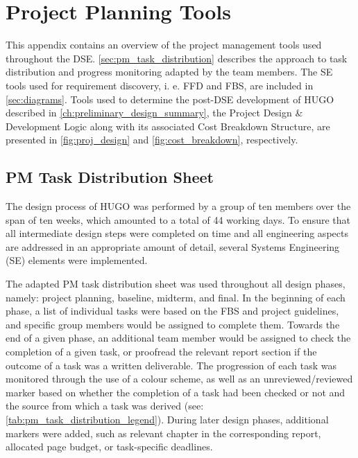 \chapter{Project Planning Tools}
\label{app:project_planning_diagrames}
This appendix contains an overview of the project management tools used throughout the DSE. \autoref{sec:pm_task_distribution} describes the approach to task distribution and progress monitoring adapted by the team members. The SE tools used for requirement discovery, i. e. FFD and FBS, are included in \autoref{sec:diagrams}. Tools used to determine the post-DSE development of HUGO described in \autoref{ch:preliminary_design_summary}, the Project Design \& Development Logic along with its associated Cost Breakdown Structure, are presented in \autoref{fig:proj_design} and \autoref{fig:cost_breakdown}, respectively.

\section{PM Task Distribution Sheet}
\label{sec:pm_task_distribution}
The design process of HUGO was performed by a group of ten members over the span of ten weeks, which amounted to a total of 44 working days. To ensure that all intermediate design steps were completed on time and all engineering aspects are addressed in an appropriate amount of detail, several Systems Engineering (SE) elements were implemented. 

The adapted PM task distribution sheet was used throughout all design phases, namely: project planning, baseline, midterm, and final. In the beginning of each phase, a list of individual tasks were based on the FBS and project guidelines, and specific group members would be assigned to complete them. Towards the end of a given phase, an additional team member would be assigned to check the completion of a given task, or proofread the relevant report section if the outcome of a task was a written deliverable. The progression of each task was monitored through the use of a colour scheme, as well as an unreviewed/reviewed marker based on whether the completion of a task had been checked or not and the source from which a task was derived (see: \autoref{tab:pm_task_distribution_legend}). During later design phases, additional markers were added, such as relevant chapter in the corresponding report, allocated page budget, or task-specific deadlines.

